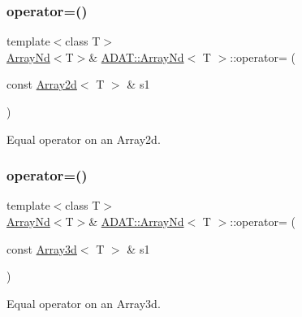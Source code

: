 \subsubsection{\texorpdfstring{operator=()}{operator=()}\hspace{0.1cm}{\footnotesize\ttfamily [9/15]}}
{\footnotesize\ttfamily template$<$class T$>$ \\
\mbox{\hyperlink{classADAT_1_1ArrayNd}{Array\+Nd}}$<$T$>$\& \mbox{\hyperlink{classADAT_1_1ArrayNd}{A\+D\+A\+T\+::\+Array\+Nd}}$<$ T $>$\+::operator= (\begin{DoxyParamCaption}\item[{const \mbox{\hyperlink{classXMLArray_1_1Array2d}{Array2d}}$<$ T $>$ \&}]{s1 }\end{DoxyParamCaption})\hspace{0.3cm}{\ttfamily [inline]}}



Equal operator on an Array2d. 

\mbox{\label{classADAT_1_1ArrayNd_aa02a148fb7073245d21688eaa40d820b}} 
\subsubsection{\texorpdfstring{operator=()}{operator=()}\hspace{0.1cm}{\footnotesize\ttfamily [10/15]}}
{\footnotesize\ttfamily template$<$class T$>$ \\
\mbox{\hyperlink{classADAT_1_1ArrayNd}{Array\+Nd}}$<$T$>$\& \mbox{\hyperlink{classADAT_1_1ArrayNd}{A\+D\+A\+T\+::\+Array\+Nd}}$<$ T $>$\+::operator= (\begin{DoxyParamCaption}\item[{const \mbox{\hyperlink{classXMLArray_1_1Array3d}{Array3d}}$<$ T $>$ \&}]{s1 }\end{DoxyParamCaption})\hspace{0.3cm}{\ttfamily [inline]}}



Equal operator on an Array3d. 

\mbox{\label{classADAT_1_1ArrayNd_aa02a148fb7073245d21688eaa40d820b}} 
